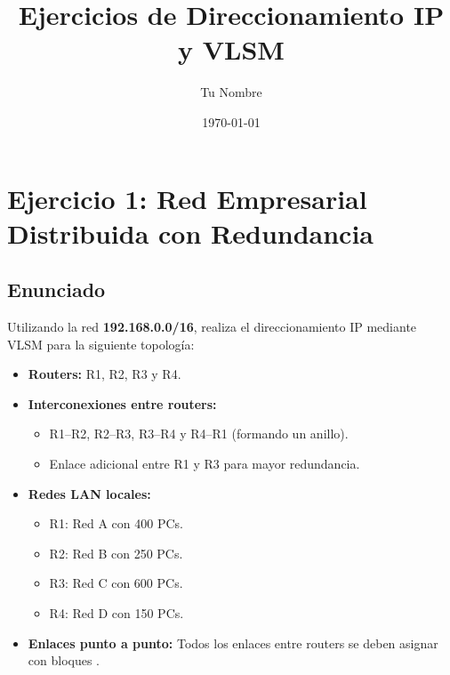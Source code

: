 \documentclass[a4paper,12pt]{article}
\title{Ejercicios de Direccionamiento IP y VLSM}
\author{Tu Nombre}
\date{\today}
\begin{document}
\maketitle

\section{Ejercicio 1: Red Empresarial Distribuida con Redundancia}

\subsection{Enunciado}
Utilizando la red \textbf{192.168.0.0/16}, realiza el direccionamiento IP mediante VLSM para la siguiente topología:
\begin{itemize}
  \item \textbf{Routers:} R1, R2, R3 y R4.
  \item \textbf{Interconexiones entre routers:}  
    \begin{itemize}
      \item R1--R2, R2--R3, R3--R4 y R4--R1 (formando un anillo).
      \item Enlace adicional entre R1 y R3 para mayor redundancia.
    \end{itemize}
  \item \textbf{Redes LAN locales:}
    \begin{itemize}
      \item R1: Red A con 400 PCs.
      \item R2: Red B con 250 PCs.
      \item R3: Red C con 600 PCs.
      \item R4: Red D con 150 PCs.
    \end{itemize}
  \item \textbf{Enlaces punto a punto:} Todos los enlaces entre routers se deben asignar con bloques \texttt{}.
\end{itemize}
\end{document}
